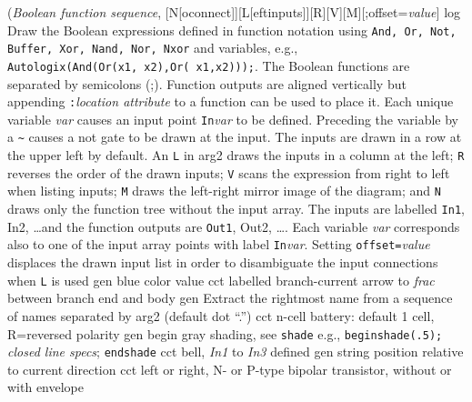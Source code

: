%
 {({\sl Boolean function sequence},%
    [N[oconnect]][L[eftinputs]][R][V][M][;offset={\sl value}]}
  {log}
  {Draw the Boolean expressions defined in function notation
   using {\tt And, Or, Not, Buffer, Xor, Nand, Nor, Nxor}
   and variables, e.g.,
   {\tt Autologix(And(Or(x1,~x2),Or(~x1,x2)));}.
   The Boolean functions are separated by semicolons (;). Function
   outputs are aligned vertically but appending
   {\tt:}{\sl location attribute} to a function can be used to place it.
   Each unique variable {\sl var} causes an input point {\tt In}{\sl var} 
   to be defined.  Preceding the variable by a {\tt \~{}} causes a not gate
   to be drawn at the input.
   The inputs are drawn in a row at the upper left by default.
   An {\tt L} in arg2 draws the inputs in a column at the left;
   {\tt R} reverses the order of the drawn inputs;
   {\tt V} scans the expression from right to left
   when listing inputs;
   {\tt M} draws the left-right mirror image of the diagram;
   and {\tt N} draws only the function tree without the input array.
   The inputs are labelled {\tt In1}, {In2}, \ldots and the function
   outputs are {\tt Out1}, {Out2}, \dots.
   Each variable {\sl var} corresponds also to one of the input array
   points with label {\tt In}{\sl var}.
   Setting {\tt offset=}{\sl value} displaces the
   drawn input list in order to disambiguate the input connections when {\tt L}
   is used}
  {gen}
  {blue color value}
  {cct}
  {labelled branch-current arrow to {\sl frac} between branch end and body
    }
  {gen}
  {Extract the rightmost name from a sequence of names separated by arg2
   (default dot ``.'')}
  {cct}
  {n-cell battery: default 1 cell,
  R=reversed polarity}
  {gen}
  {begin gray shading, see {\tt shade}
   e.g., {\tt beginshade(.5);} {\sl closed line specs}; {\tt endshade}}
  {cct}
  {bell, {\sl In1} to {\sl In3} defined
   }
  {gen}
  {string position relative to current direction}
  {cct}
  {left or right, N- or P-type bipolar transistor, without or with envelope 
    }
